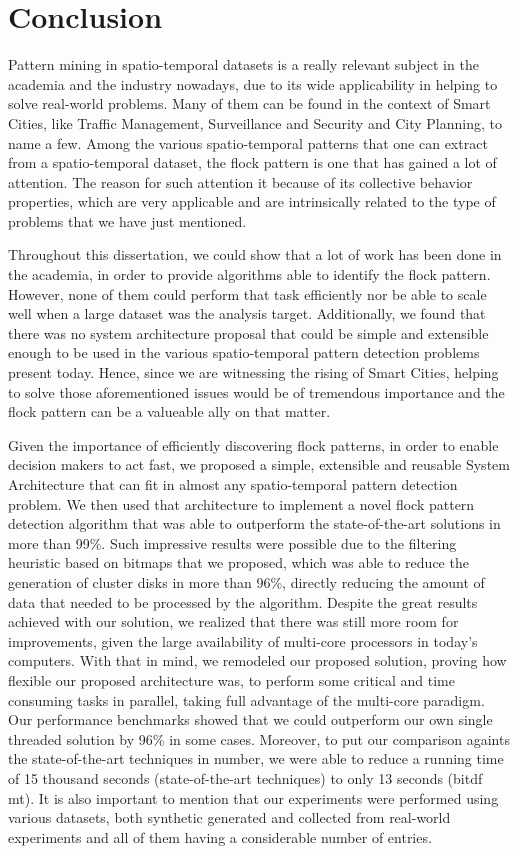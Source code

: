 \chapter{Conclusion}
\label{chp:conclusion}
Pattern mining in spatio-temporal datasets is a really relevant subject in the academia and the industry nowadays, due
to its wide applicability in helping to solve real-world problems. Many of them can be found in the context of Smart
Cities, like Traffic Management, Surveillance and Security and City Planning, to name a few. Among the various
spatio-temporal patterns that one can extract from a spatio-temporal dataset, the flock pattern is one that has gained a
lot of attention. The reason for such attention it because of its collective behavior properties, which are very
applicable and are intrinsically related to the type of problems that we have just mentioned.

Throughout this dissertation, we could show that a lot of work has been done in the academia, in order to provide
algorithms able to identify the flock pattern. However, none of them could perform that task efficiently nor be able to
scale well when a large dataset was the analysis target. Additionally, we found that there was no system architecture
proposal that could be simple and extensible enough to be used in the various spatio-temporal pattern detection problems
present today. Hence, since we are witnessing the rising of Smart Cities, helping to solve those aforementioned issues
would be of tremendous importance and the flock pattern can be a valueable ally on that matter.

Given the importance of efficiently discovering flock patterns, in order to enable decision makers to act fast, we
proposed a simple, extensible and reusable System Architecture that can fit in almost any spatio-temporal pattern
detection problem. We then used that architecture to implement a novel flock pattern detection algorithm that was able
to outperform the state-of-the-art solutions in more than 99\%. Such impressive results were possible due to the
filtering heuristic based on bitmaps that we proposed, which was able to reduce the generation of cluster disks in more
than 96\%, directly reducing the amount of data that needed to be processed by the algorithm. Despite the great results
achieved with our solution, we realized that there was still more room for improvements, given the large availability of
multi-core processors in today's computers. With that in mind, we remodeled our proposed solution, proving how flexible
our proposed architecture was, to perform some critical and time consuming tasks in parallel, taking full advantage of
the multi-core paradigm. Our performance benchmarks showed that we could outperform our own single threaded solution by
96\% in some cases. Moreover, to put our comparison againts the state-of-the-art techniques in number, we were able to
reduce a running time of 15 thousand seconds (state-of-the-art techniques) to only 13 seconds (\ac{bitdf} \ac{mt}). It
is also important to mention that our experiments were performed using various datasets, both synthetic generated and
collected from real-world experiments and all of them having a considerable number of entries.

